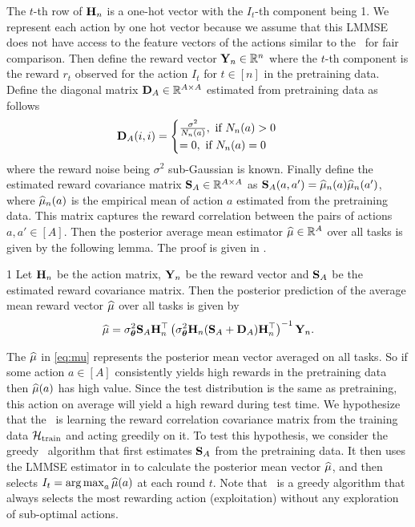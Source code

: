 \documentclass[10pt]{article}
\theoremstyle{plain}
\theoremstyle{definition}
\theoremstyle{remark}
\begin{document}
The $t$-th row of $\mathbf{H}_n$ is a one-hot vector with the  $I_t$-th component being 1. We represent each action by one hot vector because we assume that this LMMSE does not have access to the feature vectors of the actions similar to the \pred~for fair comparison.
Then define the reward vector $\mathbf{Y}_n \in \mathbb{R}^n$ where the $t$-th component is the reward $r_t$ observed for the action $I_t$ for $t\in[n]$ in the pretraining data.
Define the diagonal matrix $\mathbf{D}_A\in\mathbb{R}^{A\times A}$ estimated from pretraining data as follows
\begin{align}
    \bD_A(i,i) &= \begin{cases}
        \frac{\sigma^2}{N_n(a)}, \text{ if } N_n(a) > 0\\ \label{eq:D-matrix}
        = 0, \text{ if } N_n(a) = 0
    \end{cases}
    \vspace*{-1em}
\end{align}
where the reward noise being $\sigma^2$ sub-Gaussian is known.
Finally define the estimated reward covariance matrix $\mathbf{S}_A\in\mathbb{R}^{A\times A}$ as $\mathbf{S}_A(a,a') = \widehat{\mu}_n(a)\widehat{\mu}_n(a')$, where $\widehat{\mu}_n(a)$ is the empirical mean of action $a$ estimated from the pretraining data. This matrix captures the reward correlation between the pairs of actions $a,a'\in [A]$.
Then the posterior average mean estimator $\widehat{\mu}\in\mathbb{R}^A$ over all tasks is given by the following lemma. The proof is given in .
\begin{customlemma}{1}
\label{lemma:bayes-reg-1}
    Let $\mathbf{H}_n$ be the action matrix, $\mathbf{Y}_n$ be the reward vector and $\mathbf{S}_A$ be the estimated reward covariance matrix. Then the posterior prediction of the average mean reward vector $\widehat{\mu}$ over all tasks is given by
    \begin{align}
        \widehat{\mu} = \sigma^2_{\boldsymbol{\theta}}\mathbf{S}_A\mathbf{H}_n^\top\left(\sigma^2_{\boldsymbol{\theta}}\mathbf{H}_n(\mathbf{S}_A + \mathbf{D}_A)\mathbf{H}_n^\top\right)^{-1}\mathbf{Y}_{n}. \label{eq:mu}
    \end{align}
\end{customlemma}
The $\widehat{\mu}$ in \eqref{eq:mu} represents the posterior mean vector averaged on all tasks. So if some action $a\in [A]$ consistently yields high rewards in the pretraining data then $\widehat{\mu}(a)$ has high value. Since the test distribution is the same as pretraining, this action on average will yield a high reward during test time.
We hypothesize that the \pred\ is learning the reward correlation covariance matrix from the training data $\mathcal{H}_{\text{train}}$ and acting greedily on it. To test this hypothesis, we consider the greedy \bayes\ algorithm that first estimates $\mathbf{S}_A$ from the pretraining data. It then uses the LMMSE estimator in  to calculate the posterior mean vector $\widehat{\mu}$, and then selects $I_{t} =\mathop{\rm arg\,max}_a \widehat{\mu}(a)$ at each round $t$. Note that \bayes\ is a greedy algorithm that always selects the most rewarding action (exploitation) without any exploration of sub-optimal actions.
\end{document}
